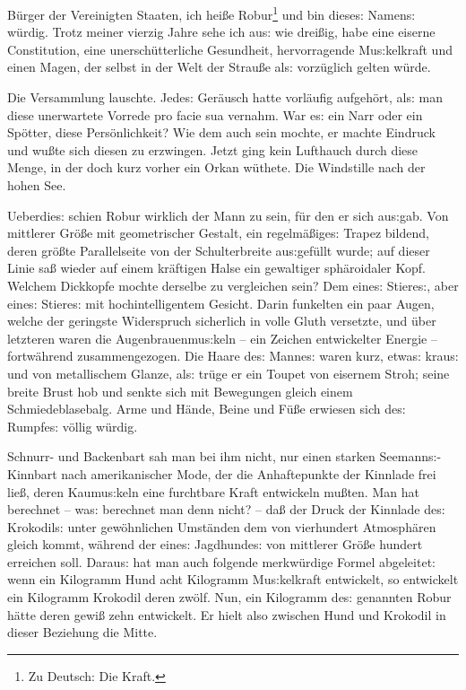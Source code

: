\documentclass[oneside,12pt]{book}
\newenvironment{antiqua}{\normalfont}{}
\newcommand{\s}{s:}
\begin{document}
{\glqq}B\"urger der Vereinigten Staaten, ich hei{\ss}e
Robur\footnote[1]{\frakfamily Zu Deutsch: Die Kraft.} und bin diese{\s}
Namen{\s} w\"urdig. Trotz meiner vierzig Jahre sehe ich au{\s} wie
drei{\ss}ig, habe eine eiserne Constitution, eine unersch\"utterliche
Gesundheit, hervorragende Mu{\s}kelkraft und einen Magen, der selbst
in der Welt der Strau{\ss}e al{\s} vorz\"uglich gelten
w\"urde.{\grqq}

Die Versammlung lauschte. Jede{\s} Ger\"ausch hatte vorl\"aufig
aufgeh\"ort, al{\s} man diese unerwartete Vorrede \begin{antiqua}pro
facie sua\end{antiqua} vernahm. War e{\s} ein Narr oder ein
Sp\"otter, diese Pers\"onlichkeit? Wie dem auch sein mochte, er
machte Eindruck und wu{\ss}te sich diesen zu erzwingen. Jetzt ging
kein Lufthauch durch diese Menge, in der doch kurz vorher ein Orkan
w\"uthete. Die Windstille nach der hohen See.

Ueberdie{\s} schien Robur wirklich der Mann zu sein, f\"ur den er
sich au{\s}gab. Von mittlerer Gr\"o{\ss}e mit geometrischer Gestalt,
ein regelm\"a{\ss}ige{\s} Trapez bildend, deren gr\"o{\ss}te
Parallelseite von der Schulterbreite au{\s}gef\"ullt wurde; auf
dieser Linie sa{\ss} wieder auf einem kr\"aftigen Halse ein
gewaltiger sph\"aroidaler Kopf. Welchem Dickkopfe mochte derselbe zu
vergleichen sein? Dem eine{\s} Stiere{\s}, aber eine{\s} Stiere{\s}
mit hochintelligentem Gesicht. Darin funkelten ein paar Augen, welche
der geringste Widerspruch sicherlich in volle Gluth versetzte, und
\"uber letzteren waren die Augenbrauenmu{\s}keln -- ein Zeichen
entwickelter Energie -- fortw\"ahrend zusammengezogen. Die Haare
de{\s} Manne{\s} waren kurz, etwa{\s} krau{\s} und von metallischem
Glanze, al{\s} tr\"uge er ein Toupet von eisernem Stroh; seine breite
Brust hob und senkte sich mit Bewegungen gleich einem
Schmiedeblasebalg. Arme und H\"ande, Beine und F\"u{\ss}e erwiesen
sich de{\s} Rumpfe{\s} v\"ollig w\"urdig.

Schnurr- und Backenbart sah man bei ihm nicht, nur einen starken
Seemann{\s}-Kinnbart nach amerikanischer Mode, der die Anhaftepunkte
der Kinnlade frei lie{\ss}, deren Kaumu{\s}keln eine furchtbare Kraft
entwickeln mu{\ss}ten. Man hat berechnet -- wa{\s} berechnet man denn
nicht? -- da{\ss} der Druck der Kinnlade de{\s} Krokodil{\s} unter
gew\"ohnlichen Umst\"anden dem von vierhundert Atmosph\"aren gleich
kommt, w\"ahrend der eine{\s} Jagdhunde{\s} von mittlerer Gr\"o{\ss}e
hundert erreichen soll. Darau{\s} hat man auch folgende merkw\"urdige
Formel abgeleitet: wenn ein Kilogramm Hund acht Kilogramm
Mu{\s}kelkraft entwickelt, so entwickelt ein Kilogramm Krokodil deren
zw\"olf. Nun, ein Kilogramm de{\s} genannten Robur h\"atte deren
gewi{\ss} zehn entwickelt. Er hielt also zwischen Hund und Krokodil
in dieser Beziehung die Mitte.
\end{document}
